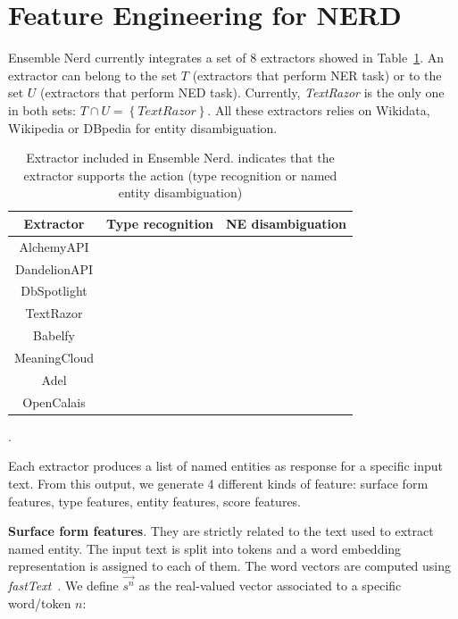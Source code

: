 \documentclass{llncs}
\newcommand{\cmark}{\ding{51}}
\newcommand{\xmark}{\ding{55}}
\newcommand{\tabref}[1]{\mbox{Table~\ref{#1}}}
\begin{document}

\section{Feature Engineering for NERD}
\label{sec:study}
Ensemble Nerd currently integrates a set of 8 extractors showed in \tabref{tab:exout}. An extractor can belong to the set $T$ (extractors that perform NER task) or to the set $U$ (extractors that perform NED task). Currently, \textit{TextRazor} is the only one in both sets: $T \cap U = \left \{  TextRazor \right \}$. All these extractors relies on Wikidata, Wikipedia or DBpedia for entity disambiguation.
 
\begin{table}
\centering
\label{tab:exout}
\begin{tabular}{|c|c|c|}
\hline
\textbf{Extractor} & \textbf{Type recognition} & \textbf{NE disambiguation} \\ \hline
AlchemyAPI    & \cmark  & \xmark \\ \hline
DandelionAPI  & \xmark  & \cmark \\ \hline
DbSpotlight   & \xmark  & \cmark \\ \hline
TextRazor     & \cmark  & \cmark \\ \hline
Babelfy       & \xmark  & \cmark \\ \hline
MeaningCloud  & \cmark  & \xmark \\ \hline
Adel          & \cmark  & \xmark \\ \hline
OpenCalais    & \cmark  & \xmark \\ \hline
\end{tabular}
\bigskip
\caption{Extractor included in Ensemble Nerd. \cmark{ }indicates that the extractor supports the action (type recognition or named entity disambiguation)}.
\end{table}

Each extractor produces a list of named entities as response for a specific input text. From this output, we generate 4 different kinds of feature: surface form features, type features, entity features, score features.

\textbf{Surface form features}. They are strictly related to the text used to extract named entity. The input text is split into tokens and a word embedding representation is assigned to each of them. The word vectors are computed using \textit{fastText}~\cite{fasttext}. We define $\vec{s^{n}}$ as the real-valued vector associated to a specific word/token $n$:
\end{document}
